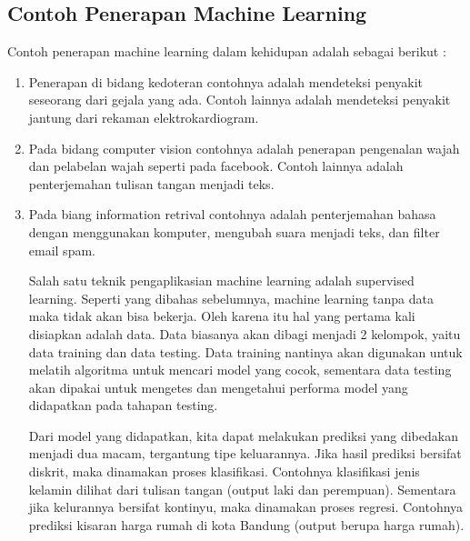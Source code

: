 \subsection{Contoh Penerapan Machine Learning}
 Contoh penerapan machine learning dalam kehidupan adalah sebagai berikut :
\begin{enumerate}
 \item Penerapan di bidang kedoteran contohnya adalah mendeteksi penyakit seseorang dari gejala yang ada. Contoh lainnya adalah mendeteksi penyakit jantung dari rekaman elektrokardiogram.
 \item Pada bidang computer vision contohnya adalah penerapan pengenalan wajah dan pelabelan wajah seperti pada facebook. Contoh lainnya adalah penterjemahan tulisan tangan menjadi teks.
 \item Pada biang information retrival contohnya adalah penterjemahan bahasa dengan menggunakan komputer, mengubah suara menjadi teks, dan filter email spam.

Salah satu teknik pengaplikasian machine learning adalah supervised learning. Seperti yang dibahas sebelumnya, machine learning tanpa data maka tidak akan bisa bekerja. Oleh karena itu hal yang pertama kali disiapkan adalah data. Data biasanya akan dibagi menjadi 2 kelompok, yaitu data training dan data testing. Data training nantinya akan digunakan untuk melatih algoritma untuk mencari model yang cocok, sementara data testing akan dipakai untuk mengetes dan mengetahui performa model yang didapatkan pada tahapan testing.
\par Dari model yang didapatkan, kita dapat melakukan prediksi yang dibedakan menjadi dua macam, tergantung tipe keluarannya. Jika hasil prediksi bersifat diskrit, maka dinamakan proses klasifikasi. Contohnya klasifikasi jenis kelamin dilihat dari tulisan tangan (output laki dan perempuan). Sementara jika kelurannya bersifat kontinyu, maka dinamakan proses regresi. Contohnya prediksi kisaran harga rumah di kota Bandung (output berupa harga rumah).


\end{enumerate}
